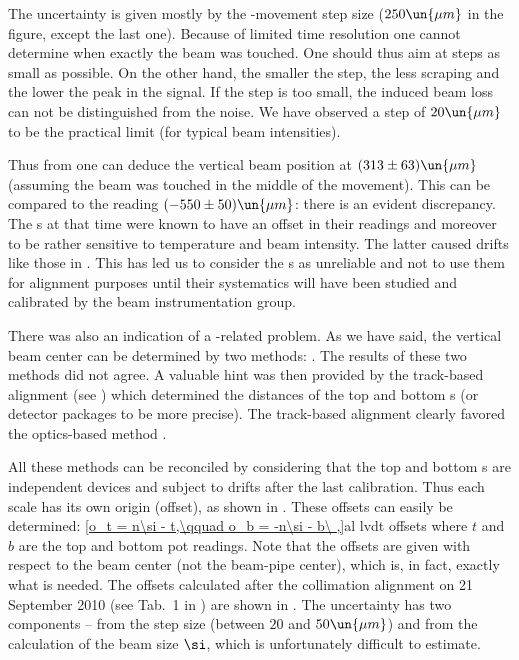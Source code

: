 The uncertainty is given mostly by the -movement step size ($250\un{\mu m}$ in the figure, except the last one). Because of limited time resolution one cannot determine when exactly the beam was touched. One should thus aim at steps as small as possible. On the other hand, the smaller the step, the less scraping and the lower the peak in the  signal. If the step is too small, the induced beam loss can not be distinguished from the noise. We have observed a step of $20\un{\mu m}$ to be the practical limit (for typical beam intensities).


Thus from  one can deduce the vertical beam position at $(313\pm 63)\un{\mu m}$ (assuming the beam was touched in the middle of the movement). This can be compared to the  reading $(-550\pm50)\un{\mu m}$: there is an evident discrepancy. The s at that time were known to have an offset in their readings and moreover to be rather sensitive to temperature and beam intensity. The latter caused drifts like those in . This has led us to consider the s as unreliable and not to use them for alignment purposes until their systematics will have been studied and calibrated by the beam instrumentation group.


There was also an indication of a -related problem. As we have said, the vertical beam center can be determined by two methods: . The results of these two methods did not agree. A valuable hint was then provided by the track-based alignment (see ) which determined the distances of the top and bottom s (or detector packages to be more precise). The track-based alignment clearly favored the optics-based method .

All these methods can be reconciled by considering that the top and bottom s are independent devices and subject to drifts after the last calibration. Thus each  scale has its own origin (offset), as shown in . These offsets can easily be determined:
\eqref{o_t = n\si - t,\qquad o_b = -n\si - b\ ,}{al lvdt offsets}
where $t$ and $b$ are the top and bottom pot  readings. Note that the offsets are given with respect to the beam center (not the beam-pipe center), which is, in fact, exactly what is needed. The offsets calculated after the collimation alignment on 21 September 2010 (see Tab.~1 in ) are shown in . The uncertainty has two components -- from the step size (between $20$ and $50\un{\mu m}$) and from the calculation of the beam size $\si$, which is unfortunately difficult to estimate.

